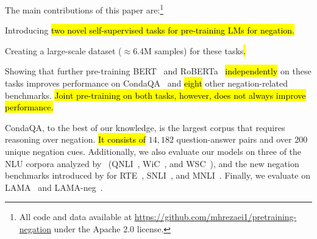 The main contributions of this paper are:\footnote{All code and data available at \url{https://github.com/mhrezaei1/pretraining-negation} under the Apache 2.0 license.}
\begin{compactitem}
    \item Introducing \hl{two novel self-supervised tasks for pre-training LMs for negation.}
    \item Creating a large-scale dataset ($\approx$6.4M samples) for these tasks\hl{.}
    \item Showing that further pre-training {{BERT}}~\cite{devlin-etal-2019-bert} and {RoBERTa}~\cite{liu2019roberta} \hl{independently} on these tasks improves performance on CondaQA~\cite{ravichander-etal-2022-condaqa} and \hl{eight} other negation-related benchmarks. \hl{Joint pre-training on both tasks, however, does not always improve performance.}
\end{compactitem}

CondaQA, to the best of our knowledge, is the largest corpus that requires reasoning over negation. \hl{It consists of} $14,182$ question-answer pairs and over 200 unique negation cues.
Additionally, we also evaluate our models on three of the NLU corpora analyzed by~\citet{hossain-etal-2022-analysis} (QNLI~\cite{rajpurkar-etal-2016-squad},
WiC~\cite{pilehvar-camacho-collados-2019-wic},
and 
WSC~\cite{levesque_winograd_2012}),
and the new negation benchmarks introduced by
\citet{hossain-etal-2020-analysis}
for RTE~\cite{dagan2005pascal},
SNLI~\cite{bowman-etal-2015-large},
and MNLI~\cite{williams-etal-2018-broad}.
Finally, we evaluate on LAMA~\cite{petroni-etal-2019-language}
and LAMA-neg~\cite{kassner-schutze-2020-negated}.